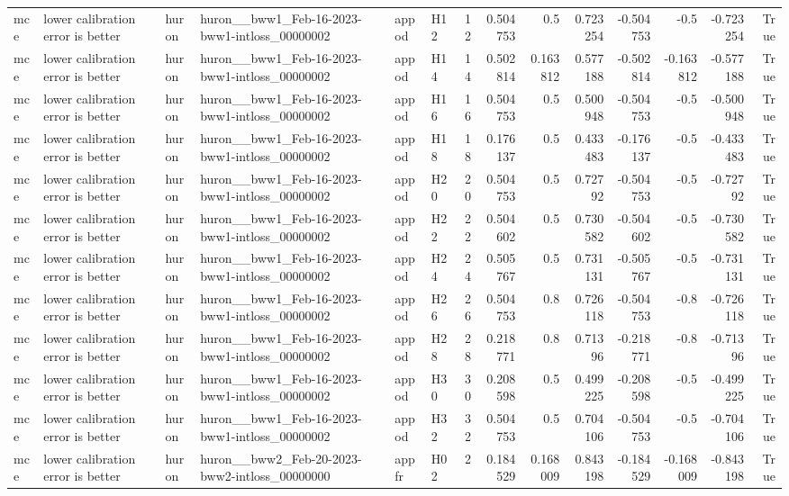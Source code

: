 \begin{longtable}{llllllrrrrrrrr}
mce & lower calibration error is better & huron & huron\_\_bww1\_Feb-16-2023-bww1-intloss\_00000002 & appod & H12 & 12 & 0.504753 & 0.5 & 0.723254 & -0.504753 & -0.5 & -0.723254 & True \\
mce & lower calibration error is better & huron & huron\_\_bww1\_Feb-16-2023-bww1-intloss\_00000002 & appod & H14 & 14 & 0.502814 & 0.163812 & 0.577188 & -0.502814 & -0.163812 & -0.577188 & True \\
mce & lower calibration error is better & huron & huron\_\_bww1\_Feb-16-2023-bww1-intloss\_00000002 & appod & H16 & 16 & 0.504753 & 0.5 & 0.500948 & -0.504753 & -0.5 & -0.500948 & True \\
mce & lower calibration error is better & huron & huron\_\_bww1\_Feb-16-2023-bww1-intloss\_00000002 & appod & H18 & 18 & 0.176137 & 0.5 & 0.433483 & -0.176137 & -0.5 & -0.433483 & True \\
mce & lower calibration error is better & huron & huron\_\_bww1\_Feb-16-2023-bww1-intloss\_00000002 & appod & H20 & 20 & 0.504753 & 0.5 & 0.72792 & -0.504753 & -0.5 & -0.72792 & True \\
mce & lower calibration error is better & huron & huron\_\_bww1\_Feb-16-2023-bww1-intloss\_00000002 & appod & H22 & 22 & 0.504602 & 0.5 & 0.730582 & -0.504602 & -0.5 & -0.730582 & True \\
mce & lower calibration error is better & huron & huron\_\_bww1\_Feb-16-2023-bww1-intloss\_00000002 & appod & H24 & 24 & 0.505767 & 0.5 & 0.731131 & -0.505767 & -0.5 & -0.731131 & True \\
mce & lower calibration error is better & huron & huron\_\_bww1\_Feb-16-2023-bww1-intloss\_00000002 & appod & H26 & 26 & 0.504753 & 0.8 & 0.726118 & -0.504753 & -0.8 & -0.726118 & True \\
mce & lower calibration error is better & huron & huron\_\_bww1\_Feb-16-2023-bww1-intloss\_00000002 & appod & H28 & 28 & 0.218771 & 0.8 & 0.71396 & -0.218771 & -0.8 & -0.71396 & True \\
mce & lower calibration error is better & huron & huron\_\_bww1\_Feb-16-2023-bww1-intloss\_00000002 & appod & H30 & 30 & 0.208598 & 0.5 & 0.499225 & -0.208598 & -0.5 & -0.499225 & True \\
mce & lower calibration error is better & huron & huron\_\_bww1\_Feb-16-2023-bww1-intloss\_00000002 & appod & H32 & 32 & 0.504753 & 0.5 & 0.704106 & -0.504753 & -0.5 & -0.704106 & True \\
mce & lower calibration error is better & huron & huron\_\_bww2\_Feb-20-2023-bww2-intloss\_00000000 & appfr & H02 & 2 & 0.184529 & 0.168009 & 0.843198 & -0.184529 & -0.168009 & -0.843198 & True \\

\end{longtable}
